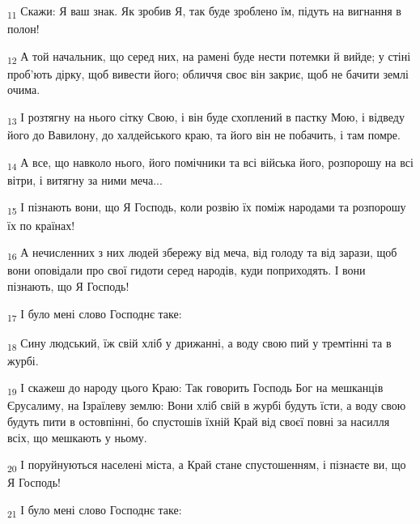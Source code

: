 \begin{tcolorbox}
\textsubscript{11} Скажи: Я ваш знак. Як зробив Я, так буде зроблено їм, підуть на вигнання в полон!
\end{tcolorbox}
\begin{tcolorbox}
\textsubscript{12} А той начальник, що серед них, на рамені буде нести потемки й вийде; у стіні проб'ють дірку, щоб вивести його; обличчя своє він закриє, щоб не бачити землі очима.
\end{tcolorbox}
\begin{tcolorbox}
\textsubscript{13} І розтягну на нього сітку Свою, і він буде схоплений в пастку Мою, і відведу його до Вавилону, до халдейського краю, та його він не побачить, і там помре.
\end{tcolorbox}
\begin{tcolorbox}
\textsubscript{14} А все, що навколо нього, його помічники та всі війська його, розпорошу на всі вітри, і витягну за ними меча...
\end{tcolorbox}
\begin{tcolorbox}
\textsubscript{15} І пізнають вони, що Я Господь, коли розвію їх поміж народами та розпорошу їх по країнах!
\end{tcolorbox}
\begin{tcolorbox}
\textsubscript{16} А нечисленних з них людей збережу від меча, від голоду та від зарази, щоб вони оповідали про свої гидоти серед народів, куди поприходять. І вони пізнають, що Я Господь!
\end{tcolorbox}
\begin{tcolorbox}
\textsubscript{17} І було мені слово Господнє таке:
\end{tcolorbox}
\begin{tcolorbox}
\textsubscript{18} Сину людський, їж свій хліб у дрижанні, а воду свою пий у тремтінні та в журбі.
\end{tcolorbox}
\begin{tcolorbox}
\textsubscript{19} І скажеш до народу цього Краю: Так говорить Господь Бог на мешканців Єрусалиму, на Ізраїлеву землю: Вони хліб свій в журбі будуть їсти, а воду свою будуть пити в остовпінні, бо спустошів їхній Край від своєї повні за насилля всіх, що мешкають у ньому.
\end{tcolorbox}
\begin{tcolorbox}
\textsubscript{20} І поруйнуються населені міста, а Край стане спустошенням, і пізнаєте ви, що Я Господь!
\end{tcolorbox}
\begin{tcolorbox}
\textsubscript{21} І було мені слово Господнє таке:
\end{tcolorbox}
